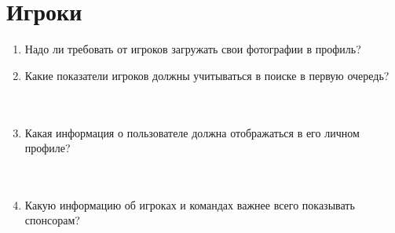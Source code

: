 \documentclass{article}
\newcommand{\red}[1]{\uline{\hspace*{1cm}\textcolor{white}{#1}\hspace*{1cm}}}
\begin{document}
  \section{Игроки}
  \begin{enumerate}[label=\arabic*), resume]
    \item Надо ли требовать от игроков загружать свои фотографии в профиль?
    \vspace{.2cm} \\ \red{\hspace{10cm}}
    \item Какие показатели игроков должны учитываться в поиске в первую очередь?
    \vspace{.2cm} \\ \red{\hspace{10cm}}
    \vspace{.2cm} \\ \red{\hspace{10cm}}
    \vspace{.2cm} \\ \red{\hspace{10cm}}

    \item Какая информация о пользователе должна отображаться в его личном профиле?
    \vspace{.2cm} \\ \red{\hspace{10cm}}
    \vspace{.2cm} \\ \red{\hspace{10cm}}
    \vspace{.2cm} \\ \red{\hspace{10cm}}

    \item Какую информацию об игроках и командах важнее всего показывать спонсорам?
    \vspace{.2cm} \\ \red{\hspace{10cm}}
    \vspace{.2cm} \\ \red{\hspace{10cm}}
    \vspace{.2cm} \\ \red{\hspace{10cm}}
  \end{enumerate}
\end{document}
